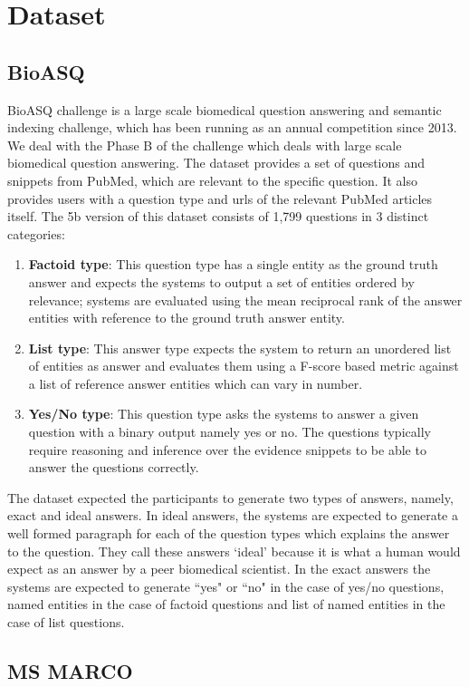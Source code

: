 
\section{Dataset}

\subsection{BioASQ}
\label{Dataset}
BioASQ challenge \cite{bioasq} is a large scale biomedical question answering and semantic indexing challenge, which has been running as an annual competition since 2013. %
We deal with the Phase B of the challenge which deals with large scale biomedical question answering. The dataset provides a set of questions and snippets from PubMed, which are relevant to the specific question. It also provides users with a question type and urls of the relevant PubMed articles itself. The 5b version of this dataset consists of 1,799 questions in 3 distinct categories:
\begin{enumerate}
    \item \textbf{Factoid type}: This question type has a single entity as the ground truth answer and expects the systems to output a set of  entities ordered by relevance; systems are evaluated using the mean reciprocal rank \cite{MRR} of the answer entities with reference to the ground truth answer entity.
    \item \textbf{List type}: This answer type expects the system to return an unordered list of entities as answer and evaluates them using a F-score based metric against a list of reference answer entities which can vary in number.
    \item \textbf{Yes/No type}: This question type asks the systems to answer a given question with a binary output namely yes or no. The questions typically require reasoning and inference over the evidence snippets to be able to answer the questions correctly.
\end{enumerate}

The dataset expected the participants to generate two types of answers, namely, exact and ideal answers. 
In ideal answers, the systems are expected to generate a well formed paragraph for each of the question types which explains the answer to the question. They call these answers `ideal' because it is what a human would expect as an answer by a peer biomedical scientist. In the exact answers the systems are expected to generate ``yes" or ``no" in the case of yes/no questions, named entities in the case of factoid questions and list of named entities in the case of list questions.

\subsection{MS MARCO}
